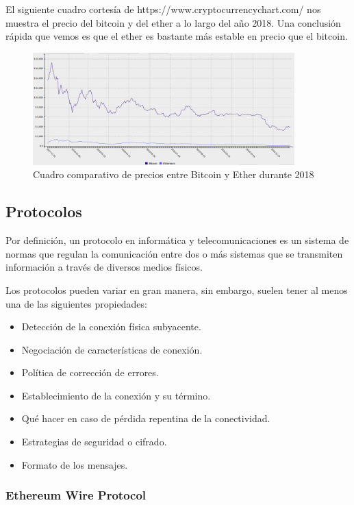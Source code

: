 El siguiente cuadro cortesía de https://www.cryptocurrencychart.com/ nos muestra el precio del 
bitcoin y del ether a lo largo del año 2018. Una conclusión rápida que vemos es que el ether es
bastante más estable en precio que el bitcoin.

\begin{figure}[htbp!] 
\centering    
\includegraphics[width=0.9\textwidth]{ethbtc2018}
\caption[EthBtc2018]{Cuadro comparativo de precios entre Bitcoin y Ether durante 2018}
\label{fig:eth-btc-2018}
\end{figure}

\subsection{Protocolos}
Por definición, un protocolo en informática y telecomunicaciones es un sistema de normas que
regulan la comunicación entre dos o más sistemas que se transmiten información a través de 
diversos medios físicos.

Los protocolos pueden variar en gran manera, sin embargo, suelen tener al menos una de las 
siguientes propiedades:

\begin{itemize}
\item Detección de la conexión física subyacente.
\item Negociación de características de conexión.
\item Política de corrección de errores.
\item Establecimiento de la conexión y su término.
\item Qué hacer en caso de pérdida repentina de la conectividad.
\item Estrategias de seguridad o cifrado.
\item Formato de los mensajes.
\end{itemize}


\subsubsection{Ethereum Wire Protocol}

